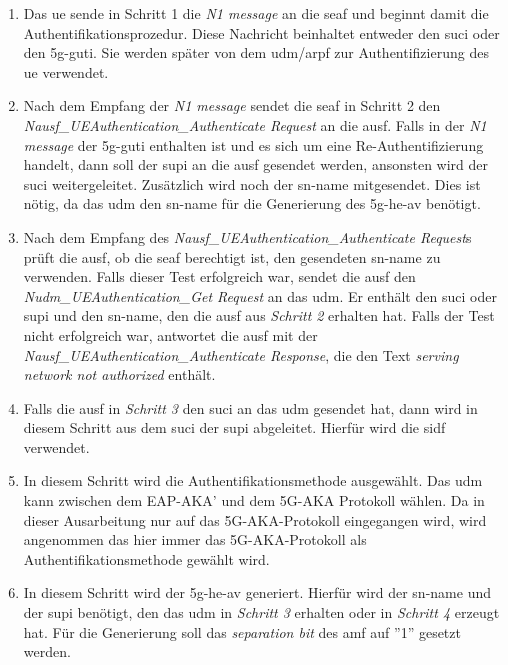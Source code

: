 \begin{enumerate}
\item Das \gls{ue} sende in Schritt 1 die \textit{N1 message} an die \gls{seaf} und beginnt damit die Authentifikationsprozedur.
Diese Nachricht beinhaltet entweder den \gls{suci} oder den \gls{5g-guti}.
Sie werden später von dem \gls{udm}/\gls{arpf} zur Authentifizierung des \gls{ue} verwendet.

\item Nach dem Empfang der \textit{N1 message} sendet die \gls{seaf} in Schritt 2 den \textit{Nausf\_UEAuthentication\_Authenticate Request} an die \gls{ausf}.
Falls in der \textit{N1 message} der \gls{5g-guti} enthalten ist und es sich um eine Re-Authentifizierung handelt, dann soll der \gls{supi} an die \gls{ausf} gesendet werden, ansonsten wird der \gls{suci} weitergeleitet.
Zusätzlich wird noch der \gls{sn-name} mitgesendet.
Dies ist nötig, da das \gls{udm} den \gls{sn-name} für die Generierung des \gls{5g-he-av} benötigt.

\item Nach dem Empfang des \textit{Nausf\_UEAuthentication\_Authenticate Request}s prüft die \gls{ausf}, ob die \gls{seaf} berechtigt ist, den gesendeten \gls{sn-name} zu verwenden.
Falls dieser Test erfolgreich war, sendet die \gls{ausf} den \textit{Nudm\_UEAuthentication\_Get Request} an das \gls{udm}.
Er enthält den \gls{suci} oder \gls{supi} und den \gls{sn-name}, den die \gls{ausf} aus \textit{Schritt 2} erhalten hat.
Falls der Test nicht erfolgreich war, antwortet die \gls{ausf} mit der \textit{Nausf\_UEAuthentication\_Authenticate Response}, die den Text \textit{serving network not authorized} enthält.

\item Falls die \gls{ausf} in \textit{Schritt 3} den \gls{suci} an das \gls{udm} gesendet hat, dann wird in diesem Schritt aus dem \gls{suci} der \gls{supi} abgeleitet.
Hierfür wird die \gls{sidf} verwendet.

\item In diesem Schritt wird die Authentifikationsmethode ausgewählt.
Das \gls{udm} kann zwischen dem EAP-AKA' und dem 5G-AKA Protokoll wählen.
Da in dieser Ausarbeitung nur auf das 5G-AKA-Protokoll eingegangen wird, wird angenommen das hier immer das 5G-AKA-Protokoll als Authentifikationsmethode gewählt wird.

\item In diesem Schritt wird der \gls{5g-he-av} generiert.
Hierfür wird der \gls{sn-name} und der \gls{supi} benötigt, den das \gls{udm} in \textit{Schritt 3} erhalten oder in \textit{Schritt 4} erzeugt hat.
Für die Generierung soll das \textit{separation bit} des \gls{amf} auf ''1'' gesetzt werden.


\end{enumerate}
